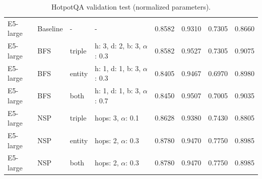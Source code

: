 \documentclass[11pt]{article}
\begin{document}
\begin{table}[t]
\begin{tabular}{llllcccc}
E5-large & Baseline & - & - & 0.8582 & 0.9310 & 0.7305 & 0.8660 \\
E5-large & BFS & triple & h: 3, d: 2, b: 3, $\alpha$: 0.3 & 0.8582 & 0.9527 & 0.7305 & 0.9075 \\
E5-large & BFS & entity & h: 1, d: 1, b: 3, $\alpha$: 0.3 & 0.8405 & 0.9467 & 0.6970 & 0.8980 \\
E5-large & BFS & both & h: 1, d: 1, b: 3, $\alpha$: 0.7 & 0.8450 & 0.9507 & 0.7005 & 0.9035 \\
E5-large & NSP & triple & hops: 3, $\alpha$: 0.1 & 0.8628 & 0.9380 & 0.7430 & 0.8805 \\
E5-large & NSP & entity & hops: 2, $\alpha$: 0.3 & 0.8780 & 0.9470 & 0.7750 & 0.8985 \\
E5-large & NSP & both & hops: 2, $\alpha$: 0.3 & 0.8780 & 0.9470 & 0.7750 & 0.8985 \\

\bottomrule
\end{tabular}
\caption{HotpotQA validation test (normalized parameters).}
\label{tab:Hot}
\end{table}
\end{document}
